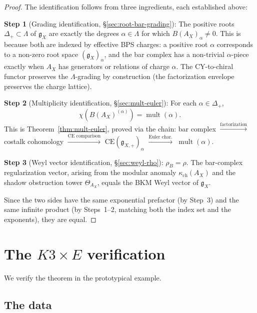 \documentclass[11pt]{article}
\theoremstyle{definition}
\theoremstyle{remark}
\DeclareMathOperator{\mult}{mult}
\newcommand{\frakg}{\mathfrak{g}}
\begin{document}
\begin{proof}[Proof]
The identification follows from three ingredients, each established above:

\textbf{Step 1} (Grading identification, \S\ref{sec:root-bar-grading}):
The positive roots $\Delta_+ \subset \Lambda$ of $\frakg_X$ are exactly the
degrees $\alpha \in \Lambda$ for which $B(A_X)_\alpha \neq 0$. This is
because both are indexed by effective BPS charges: a positive root $\alpha$
corresponds to a non-zero root space $(\frakg_X)_\alpha$, and the bar
complex has a non-trivial $\alpha$-piece exactly when $A_X$ has generators
or relations of charge $\alpha$. The CY-to-chiral functor preserves the
$\Lambda$-grading by construction (the factorization envelope preserves the
charge lattice).

\textbf{Step 2} (Multiplicity identification, \S\ref{sec:mult-euler}):
For each $\alpha \in \Delta_+$,
\[
 \chi(B(A_X)^{(\alpha)}) = \mult(\alpha).
\]
This is Theorem~\ref{thm:mult-euler}, proved via the chain:
bar complex $\xrightarrow{\text{factorization}}$
costalk cohomology $\xrightarrow{\text{CE comparison}}$
$\mathrm{CE}(\frakg_{X,+})_\alpha$ $\xrightarrow{\text{Euler char.}}$
$\mult(\alpha)$.

\textbf{Step 3} (Weyl vector identification, \S\ref{sec:weyl-rho}):
$\rho_B = \rho$. The bar-complex regularization vector, arising from the
modular anomaly $\kappa_{\mathrm{ch}}(A_X)$ and the shadow obstruction tower $\Theta_{A_X}$, equals
the BKM Weyl vector of $\frakg_X$.

Since the two sides have the same exponential prefactor (by Step~3) and
the same infinite product (by Steps~1--2, matching both the index set and
the exponents), they are equal.
\end{proof}


\section{The $K3 \times E$ verification}
\label{sec:k3e-check}

We verify the theorem in the prototypical example.

\subsection{The data}
\end{document}
